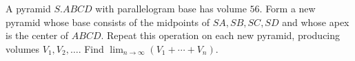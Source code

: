 A pyramid $S.ABCD$ with parallelogram base has volume $56$. Form a new pyramid whose base consists of the midpoints of $SA,SB,SC,SD$ and whose apex is the center of $ABCD$. Repeat this operation on each new pyramid, producing volumes $V_1,V_2,\ldots$. Find $\lim_{n\to\infty}(V_1+\cdots+V_n)$.
